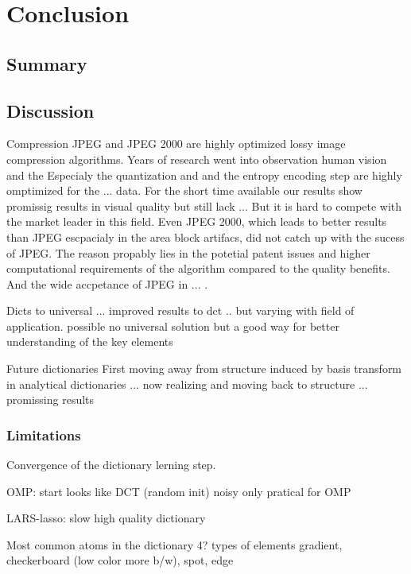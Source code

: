 \chapter{Conclusion}

\section{Summary} %

\section{Discussion}

Compression 
JPEG and JPEG 2000 are highly optimized lossy image compression algorithms. 
Years of research went into observation human vision and the 
Especialy the quantization and and the entropy encoding step are highly
omptimized for the ... data.
For the short time available our results show promissig results in visual
quality but still lack ...
But it is hard to compete with the market leader in this field.  Even JPEG 2000,
which leads to better results than JPEG escpacialy in the area block artifacs,
did not catch up with the sucess of JPEG. 
The reason propably lies in the potetial patent issues and higher computational
requirements of the algorithm compared
to the quality benefits. And the wide accpetance of JPEG in ...
.


Dicts to universal ... improved results to dct .. but varying with field of
application. possible no universal solution but a good way for better
understanding of the key elements 

Future dictionaries
First moving away from structure induced by basis transform in analytical
dictionaries ... now realizing and moving back to structure ... promissing
results\cite{?,?,?}



\subsection*{Limitations}
Convergence of the dictionary lerning step.

OMP:
  start looks like DCT (random init)
  noisy
  only pratical for OMP

LARS-lasso:
  slow 
  high quality dictionary

  Most common atoms in the dictionary 
  4? types of elements
  gradient, checkerboard (low color more b/w), spot, edge

